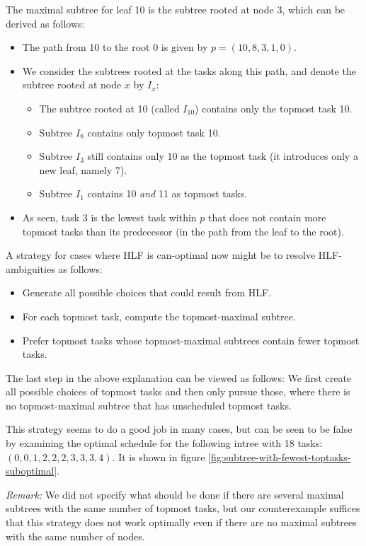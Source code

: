 The maximal subtree for leaf 10 is the subtree rooted at node 3, which can be derived as follows:
\begin{itemize}
\item The path from 10 to the root 0 is given by $p=(10,8,3,1,0)$.
\item We consider the subtrees rooted at the tasks along this path, and denote the subtree rooted at node $x$ by $I_x$:
  \begin{itemize}
  \item The subtree rooted at 10 (called $I_{10}$) contains only the topmost task 10.
  \item Subtree $I_8$ contains only topmost task 10.
  \item Subtree $I_3$ still contains only 10 as the topmost task (it introduces only a new leaf, namely 7).
  \item Subtree $I_1$ contains 10 \emph{and} 11 as topmost tasks.
  \end{itemize}
\item As seen, task 3 is the lowest task within $p$ that does not contain more topmost tasks than its predecessor (in the path from the leaf to the root).
\end{itemize}

A strategy for cases where HLF is can-optimal now might be to resolve HLF-ambiguities as follows:
\begin{itemize}
\item Generate all possible choices that could result from HLF.
\item For each topmost task, compute the topmost-maximal subtree.
\item Prefer topmost tasks whose topmost-maximal subtrees contain fewer topmost tasks.
\end{itemize}

The last step in the above explanation can be viewed as follows: We first create all possible choices of topmost tasks and then only pursue those, where there is no topmost-maximal subtree that has unscheduled topmost tasks.

This strategy seems to do a good job in many cases, but can be seen to be false by examining the optimal schedule for the following intree with 18 tasks: $(0,0,1,2,2,2,3,3,3,4)$. It is shown in figure \ref{fig:subtree-with-fewest-toptasks-suboptimal}.

\emph{Remark:} We did not specify what should be done if there are several maximal subtrees with the same number of topmost tasks, but our counterexample suffices that this strategy does not work optimally even if there are no maximal subtrees with the same number of nodes.

